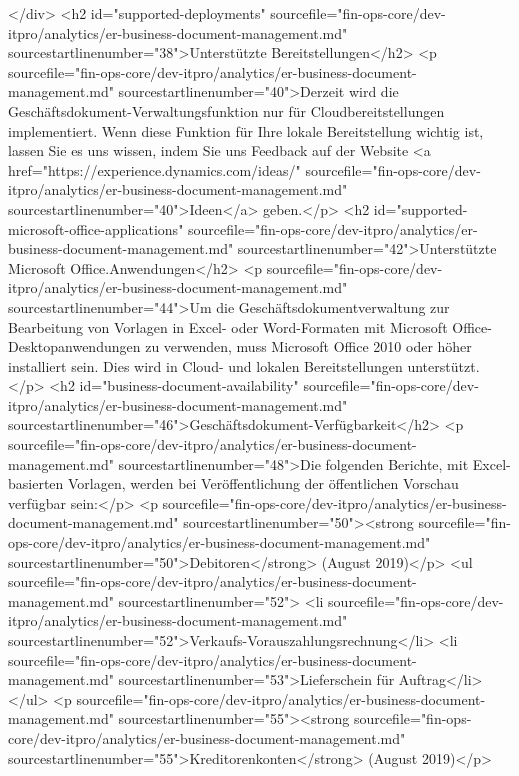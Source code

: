 </div>
<h2 id="supported-deployments" sourcefile="fin-ops-core/dev-itpro/analytics/er-business-document-management.md" sourcestartlinenumber="38">Unterstützte Bereitstellungen</h2>
<p sourcefile="fin-ops-core/dev-itpro/analytics/er-business-document-management.md" sourcestartlinenumber="40">Derzeit wird die Geschäftsdokument-Verwaltungsfunktion nur für Cloudbereitstellungen implementiert. Wenn diese Funktion für Ihre lokale Bereitstellung wichtig ist, lassen Sie es uns wissen, indem Sie uns Feedback auf der Website <a href="https://experience.dynamics.com/ideas/" sourcefile="fin-ops-core/dev-itpro/analytics/er-business-document-management.md" sourcestartlinenumber="40">Ideen</a> geben.</p>
<h2 id="supported-microsoft-office-applications" sourcefile="fin-ops-core/dev-itpro/analytics/er-business-document-management.md" sourcestartlinenumber="42">Unterstützte Microsoft Office.Anwendungen</h2>
<p sourcefile="fin-ops-core/dev-itpro/analytics/er-business-document-management.md" sourcestartlinenumber="44">Um die Geschäftsdokumentverwaltung zur Bearbeitung von Vorlagen in Excel- oder Word-Formaten mit Microsoft Office-Desktopanwendungen zu verwenden, muss Microsoft Office 2010 oder höher installiert sein. Dies wird in Cloud- und lokalen Bereitstellungen unterstützt.</p>
<h2 id="business-document-availability" sourcefile="fin-ops-core/dev-itpro/analytics/er-business-document-management.md" sourcestartlinenumber="46">Geschäftsdokument-Verfügbarkeit</h2>
<p sourcefile="fin-ops-core/dev-itpro/analytics/er-business-document-management.md" sourcestartlinenumber="48">Die folgenden Berichte, mit Excel-basierten Vorlagen, werden bei Veröffentlichung der öffentlichen Vorschau verfügbar sein:</p>
<p sourcefile="fin-ops-core/dev-itpro/analytics/er-business-document-management.md" sourcestartlinenumber="50"><strong sourcefile="fin-ops-core/dev-itpro/analytics/er-business-document-management.md" sourcestartlinenumber="50">Debitoren</strong> (August 2019)</p>
<ul sourcefile="fin-ops-core/dev-itpro/analytics/er-business-document-management.md" sourcestartlinenumber="52">
<li sourcefile="fin-ops-core/dev-itpro/analytics/er-business-document-management.md" sourcestartlinenumber="52">Verkaufs-Vorauszahlungsrechnung</li>
<li sourcefile="fin-ops-core/dev-itpro/analytics/er-business-document-management.md" sourcestartlinenumber="53">Lieferschein für Auftrag</li>
</ul>
<p sourcefile="fin-ops-core/dev-itpro/analytics/er-business-document-management.md" sourcestartlinenumber="55"><strong sourcefile="fin-ops-core/dev-itpro/analytics/er-business-document-management.md" sourcestartlinenumber="55">Kreditorenkonten</strong> (August 2019)</p>
